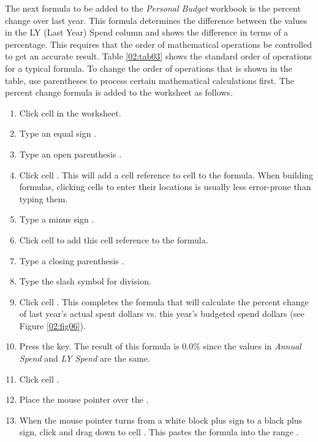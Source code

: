 The next formula to be added to the \textit{Personal Budget} workbook is the percent change over last year. This formula determines the difference between the values in the LY (Last Year) Spend column and shows the difference in terms of a percentage. This requires that the order of mathematical operations be controlled to get an accurate result. Table \ref{02:tab03} shows the standard order of operations for a typical formula. To change the order of operations that is shown in the table, use parentheses to process certain mathematical calculations first. The percent change formula is added to the worksheet as follows.

\begin{enumbox}
	\begin{enumerate}
		\item Click cell  in the  worksheet.
		\item Type an equal sign \fmtTyping{=}.
		\item Type an open parenthesis \fmtTyping{(}.
		\item Click cell . This will add a cell reference to cell  to the formula. When building formulas, clicking cells to enter their locations is usually less error-prone than typing them.
		\item Type a minus sign \fmtTyping{-}.
		\item Click cell  to add this cell reference to the formula.
		\item Type a closing parenthesis \fmtTyping{)}.
		\item Type the slash \fmtTyping{/} symbol for division.
		\item Click cell . This completes the formula that will calculate the percent change of last year's actual spent dollars vs. this year's budgeted spend dollars (see Figure \ref{02:fig06}).
		\item Press the  key. The result of this formula is $ 0.0\% $ since the values in \textit{Annual Spend} and \textit{LY Spend} are the same.
		\item Click cell .
		\item Place the mouse pointer over the .
		\item When the mouse pointer turns from a white block plus sign to a black plus sign, click and drag down to cell . This pastes the formula into the range .
	\end{enumerate}
\end{enumbox}


